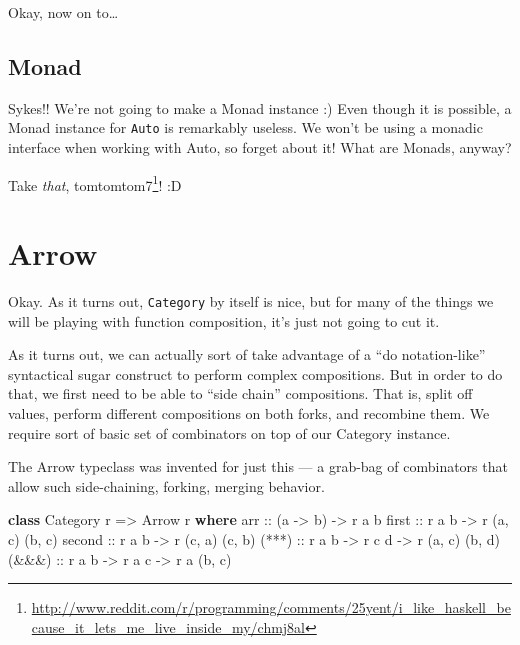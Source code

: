 \documentclass[]{article}
\newenvironment{Shaded}{}{}
\newcommand{\KeywordTok}[1]{\textcolor[rgb]{0.00,0.44,0.13}{\textbf{{#1}}}}
\newcommand{\DataTypeTok}[1]{\textcolor[rgb]{0.56,0.13,0.00}{{#1}}}
\newcommand{\OtherTok}[1]{\textcolor[rgb]{0.00,0.44,0.13}{{#1}}}
\newcommand{\NormalTok}[1]{{#1}}
\renewcommand{\href}[2]{#2\footnote{\url{#1}}}
\begin{document}
Okay, now on to\ldots{}

\subsection{Monad}\label{monad}

Sykes!! We're not going to make a Monad instance :) Even though it is
possible, a Monad instance for \texttt{Auto} is remarkably useless. We
won't be using a monadic interface when working with Auto, so forget
about it! What are Monads, anyway?

Take \emph{that},
\href{http://www.reddit.com/r/programming/comments/25yent/i_like_haskell_because_it_lets_me_live_inside_my/chmj8al}{tomtomtom7}!
:D

\section{Arrow}\label{arrow}

Okay. As it turns out, \texttt{Category} by itself is nice, but for many
of the things we will be playing with function composition, it's just
not going to cut it.

As it turns out, we can actually sort of take advantage of a ``do
notation-like'' syntactical sugar construct to perform complex
compositions. But in order to do that, we first need to be able to
``side chain'' compositions. That is, split off values, perform
different compositions on both forks, and recombine them. We require
sort of basic set of combinators on top of our Category instance.

The Arrow typeclass was invented for just this --- a grab-bag of
combinators that allow such side-chaining, forking, merging behavior.

\begin{Shaded}
\begin{Highlighting}[]
\KeywordTok{class} \DataTypeTok{Category} \NormalTok{r }\OtherTok{=>} \DataTypeTok{Arrow} \NormalTok{r }\KeywordTok{where}
\OtherTok{    arr    ::} \NormalTok{(a }\OtherTok{->} \NormalTok{b) }\OtherTok{->} \NormalTok{r a b}
\OtherTok{    first  ::} \NormalTok{r a b }\OtherTok{->} \NormalTok{r (a, c) (b, c)}
\OtherTok{    second ::} \NormalTok{r a b }\OtherTok{->} \NormalTok{r (c, a) (c, b)}
\OtherTok{    (***)  ::} \NormalTok{r a b }\OtherTok{->} \NormalTok{r c d }\OtherTok{->} \NormalTok{r (a, c) (b, d)}
\OtherTok{    (&&&)  ::} \NormalTok{r a b }\OtherTok{->} \NormalTok{r a c }\OtherTok{->} \NormalTok{r a (b, c)}
\end{Highlighting}
\end{Shaded}
\end{document}
